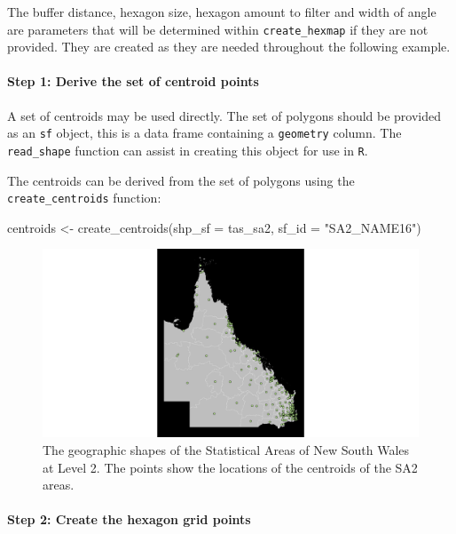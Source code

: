 The buffer distance, hexagon size, hexagon amount to filter and width of
angle are parameters that will be determined within
\texttt{create\_hexmap} if they are not provided. They are created as
they are needed throughout the following example.

\hypertarget{step-1-derive-the-set-of-centroid-points}{%
\paragraph{Step 1: Derive the set of centroid
points}\label{step-1-derive-the-set-of-centroid-points}}

A set of centroids may be used directly. The set of polygons should be
provided as an \texttt{sf} object, this is a data frame containing a
\texttt{geometry} column. The \texttt{read\_shape} function can assist
in creating this object for use in \texttt{R}.

The centroids can be derived from the set of polygons using the
\texttt{create\_centroids} function:

\begin{Schunk}
\begin{Sinput}
centroids <- create_centroids(shp_sf = tas_sa2, sf_id = "SA2_NAME16")
\end{Sinput}
\end{Schunk}

\begin{figure}[h]
\centering
\includegraphics[width=14cm]{figs/1centroids.png}
\caption{\label{fig:centroids_plot}The geographic shapes of the Statistical Areas of New South Wales at Level 2. The points show the locations of the centroids of the SA2 areas.}
\end{figure}

\hypertarget{step-2-create-the-hexagon-grid-points}{%
\paragraph{Step 2: Create the hexagon grid
points}\label{step-2-create-the-hexagon-grid-points}}

